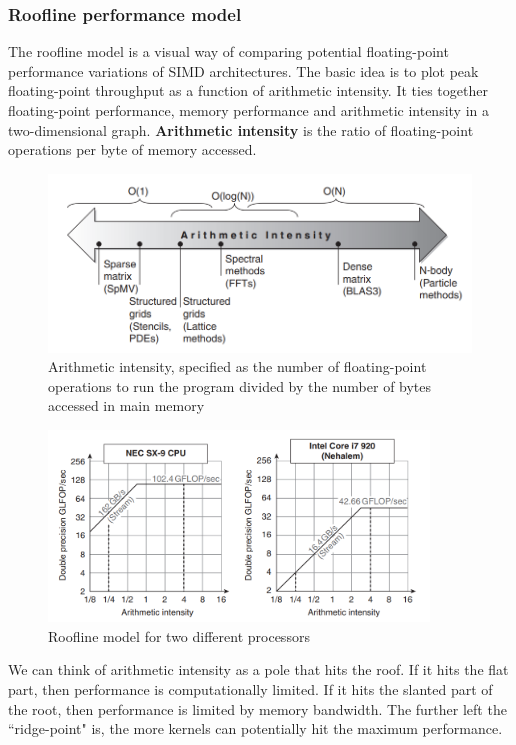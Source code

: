 \documentclass[11pt]{article}
\begin{document}
\subsubsection{Roofline performance model}
The roofline model is a visual way of comparing potential floating-point performance variations of SIMD architectures. The basic idea is to plot peak floating-point throughput as a function of arithmetic intensity. It ties together floating-point performance, memory performance and arithmetic intensity in a two-dimensional graph. \textbf{Arithmetic intensity} is the ratio of floating-point operations per byte of memory accessed.
\begin{figure}[H]
\centering
\includegraphics[width=1\textwidth, keepaspectratio]{imgs/roofline-model.png}
\caption{Arithmetic intensity, specified as the number of floating-point operations to run the program divided by the number of bytes accessed in main memory}
\end{figure}
\noindent


\begin{figure}[H]
\centering
\includegraphics[width=0.9\textwidth, keepaspectratio]{imgs/roofline-model2.png}
\caption{Roofline model for two different processors}
\end{figure}
\noindent
We can think of arithmetic intensity as a pole that hits the roof. If it hits the flat part, then performance is computationally limited. If it hits the slanted part of the root, then performance is limited by memory bandwidth. The further left the ``ridge-point" is, the more kernels can potentially hit the maximum performance. 
\end{document}

